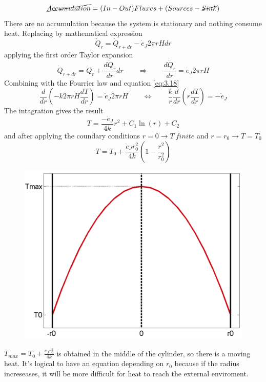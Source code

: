	\begin{equation}
		\cancel{Accumulation} = (In - Out) Fluxes + (Sources - \cancel{Sink})
	\end{equation}
	There are no accumulation because the system is stationary and nothing consume heat. Replacing by mathematical expression
	\begin{equation}
		\dot{Q}_r = \dot{Q}_{r+dr} - \dot{e}_J 2\pi r H dr
	\end{equation}
	applying the first order Taylor expansion
	\begin{equation}
		\dot{Q}_{r+dr} = \dot{Q}_r + \frac{d\dot{Q}_r}{dr}dr \qquad \Rightarrow \qquad \frac{d\dot{Q}_r}{dr} = \dot{e}_J 2\pi rH 
	\end{equation}
	Combining with the Fourrier law and equation \autoref{eq:3.18} 
	\begin{equation}
		\frac{d}{dr}\left(-k 2\pi rH\frac{dT}{dr}\right) = \dot{e}_J 2\pi r H \qquad \Leftrightarrow \qquad \frac{k}{r}\frac{d}{dr}\left(r\frac{dT}{dr}\right) = -\dot{e}_J
	\end{equation}
	The intagration gives the result 
	\begin{equation}
		T = \frac{-\dot{e}_J}{4k}r^2 + C_1 \ln (r) +C_2
	\end{equation}
	and after applying the coundary conditions $r = 0 \rightarrow T \ finite$ and $r = r_0 \rightarrow T = T_0$
	\begin{equation}
		T = T_0 + \frac{\dot{e}_Jr_0^2}{4k}\left( 1-\frac{r^2}{r_0^2} \right)
	\end{equation}
	
	\begin{figure}
	\vspace{-10mm}
	\includegraphics[scale=0.15]{ch3/12}
	\end{figure}
	$T_{max} = T_0 + \frac{\dot{e}_Jr_0^2}{4k}$ is obtained in the middle of the cylinder, so there is a moving heat. It's logical to have an equation depending on $r_0$ because if the radius increseases, it will be more difficult for heat to reach the external enviroment. \\
	
